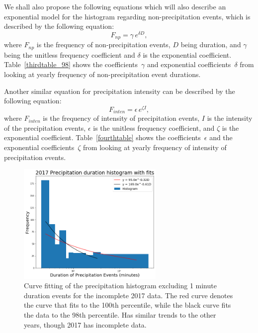 \documentclass[11pt]{report}
\begin{document}
We shall also propose the following equations which will also describe an
exponential model for the histogram regarding non-precipitation events,
which is described by the following equation:
\begin{equation}\label{expod_np}
	F_{np} = \gamma \,e^{\delta D},
\end{equation}
where $F_{np}$ is the frequency of non-precipitation events, $D$ being
duration, and $\gamma $ being the unitless frequency coefficient and $\delta
$ is the exponential coefficient. Table~\ref{thirdtable_98} shows the
coefficients~$\gamma$ and exponential coefficients~$\delta$ from looking at
yearly frequency of non-precipitation event durations.

Another similar equation for precipitation intensity can be described by the
following equation:
\begin{equation}\label{expod_inten}
	F_{inten} = \epsilon \,e^{\zeta I},
\end{equation}
where $F_{inten}$ is the frequency of intensity of precipitation events, $I$
is the intensity of the precipitation events, $\epsilon$ is the unitless
frequency coefficient, and $\zeta$ is the exponential
coefficient. Table~\ref{fourthtable} shows the coefficients~$\epsilon$ and
the exponential coefficients~$\zeta$ from looking at yearly frequency of
intensity of precipitation events.

\clearpage
\begin{figure}[t]
\centering
\includegraphics[width=0.625\textwidth]{Figures/precip17_new.png}
\caption[2017 precipitation duration exponentials with contrasting curve fitting]
{\label{precip17_redone}Curve fitting of the precipitation histogram
  excluding 1 minute duration events for the incomplete 2017 data. The red
  curve denotes the curve that fits to the 100th percentile, while the black
  curve fits the data to the 98th percentile. Has similar trends to the
  other years, though 2017 has incomplete data.}
\end{figure}
\end{document}
